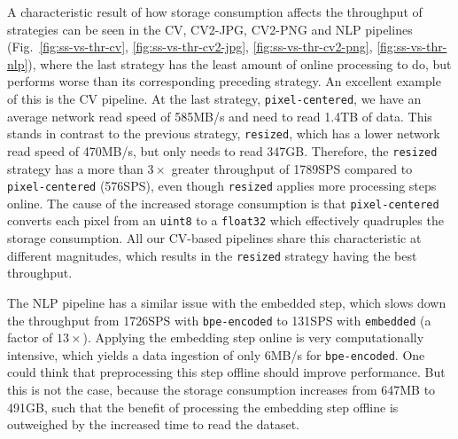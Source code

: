 {A characteristic result of how storage consumption affects the throughput of strategies can be seen in the CV, CV2-JPG, CV2-PNG and NLP pipelines (Fig.~\ref{fig:ss-vs-thr-cv}, \ref{fig:ss-vs-thr-cv2-jpg}, \ref{fig:ss-vs-thr-cv2-png}, \ref{fig:ss-vs-thr-nlp}), where the last strategy has the least amount of online processing to do, but performs worse than its corresponding preceding strategy.
An excellent example of this is the CV pipeline.
At the last strategy, \texttt{pixel-centered}, we have an average network read speed of 585\:MB/s and need to read 1.4\:TB of data.
This stands in contrast to the previous strategy, \texttt{resized}, which has a lower network read speed of 470\:MB/s, but only needs to read 347\:GB.
Therefore, the \texttt{resized} strategy has a more than $3\times$ greater throughput of 1789\:SPS compared to \texttt{pixel-centered} (576\:SPS), even though \texttt{resized} applies more processing steps online.
The cause of the increased storage consumption is that \texttt{pixel-centered} converts each pixel from an \texttt{uint8} to a \texttt{float32} which effectively quadruples the storage consumption.
All our CV-based pipelines share this characteristic at different magnitudes, which results in the \texttt{resized} strategy having the best throughput.

}


{\color{diff2}
The NLP pipeline has a similar issue with the embedded step, which slows down the throughput from 1726\:SPS with \texttt{bpe-encoded} to 131\:SPS with \texttt{embedded} (a factor of $13\times$).
Applying the embedding step online is very computationally intensive, which yields a data ingestion of only 6\:MB/s for \texttt{bpe-encoded}.
One could think that preprocessing this step offline should improve performance.
But this is not the case, because the storage consumption increases from 647\:MB to 491\:GB, such that the benefit of processing the embedding step offline is outweighed by the increased time to read the dataset.
}

